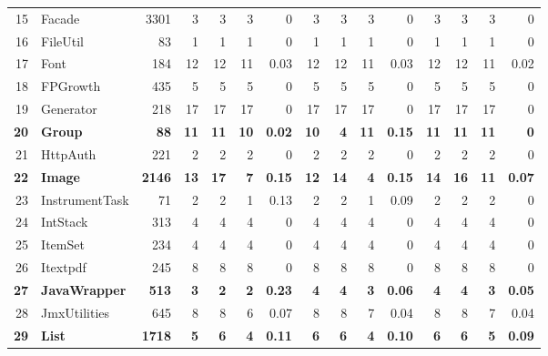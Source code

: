 \documentclass[conference]{IEEEtran}
\begin{document}
\begin{table} [htp!]
{\begin{tabularx}{1 \textwidth}{r l r r r r r r r r r r r r r}
15						& Facade					&3301		& 3		&	3	&	3	& 	0					& 3		& 3 		& 3		& 		0			& 3			& 3			& 3			&	0\\   
16						& FileUtil					&83			& 1		&	1	&	1	& 	0					& 1		& 1 		& 1		& 		0			& 1			& 1			& 1			&	0\\      
17						& Font					&184		&12		&	12	&	11	& 	0.03					& 12		& 12 		& 11		& 		0.03			& 12			& 12			& 11			&	0.02\\        
18						& FPGrowth				&435		& 5		&	5	&	5	& 	0					& 5		&  5		& 5		& 		0			& 5			& 5			& 5			&	0	\\       
19						& Generator				&218		& 17		&	17	&	17	& 	0					& 17		& 17 		& 17		& 		0			& 17			& 17			& 17			&	0	\\      
\textbf{20}						& \textbf{Group}					&\textbf{88}			& \textbf{11}		&	\textbf{11}	&	\textbf{10}	& 	\textbf{0.02}					& \textbf{10}		& \textbf{4} 		& \textbf{11}		& 		\textbf{0.15}			& \textbf{11}			& \textbf{11}			& \textbf{11}			&	\textbf{0}	\\      
21						& HttpAuth				&221		& 2		&	2	&	2	& 	0					& 2		& 2 		& 2		& 		0			& 2			& 2			& 2			&	0	\\         
\textbf{22}						& \textbf{Image}					&\textbf{2146}		& \textbf{13}		&	\textbf{17}	&	\textbf{7}	& 	\textbf{0.15}					& \textbf{12}		& \textbf{14} 		& \textbf{4}	& 		\textbf{0.15}			& \textbf{14}			& \textbf{16}			& \textbf{11}			&	\textbf{0.07}\\        
23						& InstrumentTask			&71			& 2		&	2	&	1	& 	0.13					& 2		& 2 		& 1		& 		0.09			& 2			& 2			& 2			&	0	\\    
24						& IntStack					&313		& 4		&	4	&	4	& 	0					& 4		& 4 		& 4		& 		0			& 4			& 4			& 4			&	0	\\      
25						& ItemSet					&234		& 4		&	4	&	4	& 	0					& 4		& 4 		& 4		& 		0			& 4			& 4			& 4			&	0	\\       
26						& Itextpdf					&245		& 8		&	8	&	8	& 	0					& 8		&  8		& 8		& 		0			& 8			& 8			& 8			&	0\\      
\textbf{27}						& \textbf{JavaWrapper}				&\textbf{513}		&\textbf{3}		&	\textbf{2}	&	\textbf{2}	& 	\textbf{0.23}					& \textbf{4}		& \textbf{4} 		& \textbf{3}		& 		\textbf{0.06}			& \textbf{4}			& \textbf{4}			& \textbf{3}			&	\textbf{0.05}\\      
28						& JmxUtilities				&645		& 8		&	8	&	6	& 	0.07					& 8		& 8 		& 7		& 		0.04			& 8			& 8			& 7			&	0.04\\      
\textbf{29}						& \textbf{List}					&\textbf{1718}		& \textbf{5}		&	\textbf{6}	&	\textbf{4}	& 	\textbf{0.11}					& \textbf{6}		& \textbf{6} 		& \textbf{4}		& 		\textbf{0.10}			&\textbf{6}			& \textbf{6}			& \textbf{5}			&	\textbf{0.09}\\      

\end{tabularx}}
\end{table}
\end{document}

